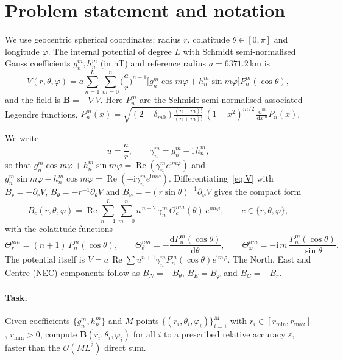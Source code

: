 \documentclass[11pt,a4paper]{article}
\theoremstyle{remark}
\newcommand{\eps}{\varepsilon}
\newcommand{\Th}{\Theta}
\newcommand{\Oh}{\mathcal{O}}
\renewcommand{\Re}{\operatorname{Re}}
\begin{document}
\section{Problem statement and notation}\label{sec:problem}

We use geocentric spherical coordinates: radius $r$, colatitude $\theta\in[0,\pi]$ and
longitude $\varphi$. The internal potential of degree $L$ with Schmidt semi-normalised Gauss coefficients
$g_n^m,h_n^m$ (in nT) and reference radius $a=6371.2$\,km is
\begin{equation}\label{eq:V}
V(r,\theta,\varphi)=a\sum_{n=1}^{L}\sum_{m=0}^{n}\Big(\frac ar\Big)^{n+1}
\big[g_n^m\cos m\varphi+h_n^m\sin m\varphi\big]P_n^m(\cos\theta),
\end{equation}
and the field is $\mathbf B=-\nabla V$. Here $P_n^m$ are the Schmidt semi-normalised
associated Legendre functions,
$P_n^m(x)=\sqrt{(2-\delta_{m0})\frac{(n-m)!}{(n+m)!}}\,(1-x^2)^{m/2}\,\frac{\mathrm d^m}{\mathrm dx^m}P_n(x)$.

We write
\begin{equation}
u=\frac ar,\qquad \gamma_n^m=g_n^m-\mathrm i\,h_n^m,
\end{equation}
so that $g_n^m\cos m\varphi+h_n^m\sin m\varphi=\Re(\gamma_n^m e^{\mathrm i m\varphi})$ and
$g_n^m\sin m\varphi-h_n^m\cos m\varphi=\Re(-\mathrm i\gamma_n^m e^{\mathrm i m\varphi})$.
Differentiating~\eqref{eq:V} with
$B_r=-\partial_rV$, $B_\theta=-r^{-1}\partial_\theta V$ and $B_\varphi=-(r\sin\theta)^{-1}\partial_\varphi V$ gives the
compact form
\begin{equation}\label{eq:Bcomp}
\boxed{\;B_c(r,\theta,\varphi)=\Re\sum_{n=1}^{L}\sum_{m=0}^{n}u^{\,n+2}\,\gamma_n^m\,
\Th_c^{nm}(\theta)\,e^{\mathrm i m\varphi},\qquad c\in\{r,\theta,\varphi\},\;}
\end{equation}
with the colatitude functions
\begin{equation}\label{eq:Theta}
\Th_r^{nm}=(n+1)\,P_n^m(\cos\theta),\qquad
\Th_\theta^{nm}=-\frac{\mathrm d P_n^m(\cos\theta)}{\mathrm d\theta},\qquad
\Th_\varphi^{nm}=-\mathrm i\,m\,\frac{P_n^m(\cos\theta)}{\sin\theta}.
\end{equation}
The potential itself is $V=a\,\Re\sum u^{n+1}\gamma_n^m P_n^m(\cos\theta)e^{\mathrm im\varphi}$.
The North, East and Centre (NEC) components follow as $B_N=-B_\theta$, $B_E=B_\varphi$ and $B_C=-B_r$.

\paragraph{Task.} Given coefficients $\{g_n^m,h_n^m\}$ and $M$ points
$\{(r_i,\theta_i,\varphi_i)\}_{i=1}^M$ with $r_i\in[r_{\min},r_{\max}]$, $r_{\min}>0$, compute
$\mathbf B(r_i,\theta_i,\varphi_i)$ for all $i$ to a prescribed relative accuracy $\eps$, faster
than the $\Oh(ML^2)$ direct sum.
\end{document}
